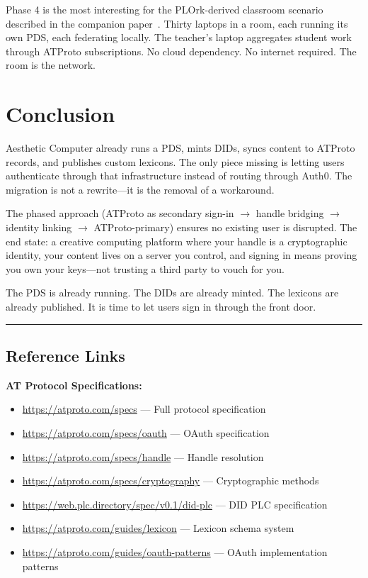 \documentclass[10pt,letterpaper,twocolumn]{article}
\begin{document}
Phase 4 is the most interesting for the PLOrk-derived classroom scenario described in the companion paper~\citep{scudder2026ac}. Thirty laptops in a room, each running its own PDS, each federating locally. The teacher's laptop aggregates student work through ATProto subscriptions. No cloud dependency. No internet required. The room is the network.


\section{Conclusion}

Aesthetic Computer already runs a PDS, mints DIDs, syncs content to ATProto records, and publishes custom lexicons. The only piece missing is letting users authenticate through that infrastructure instead of routing through Auth0. The migration is not a rewrite---it is the removal of a workaround.

The phased approach (ATProto as secondary sign-in $\to$ handle bridging $\to$ identity linking $\to$ ATProto-primary) ensures no existing user is disrupted. The end state: a creative computing platform where your handle is a cryptographic identity, your content lives on a server you control, and signing in means proving you own your keys---not trusting a third party to vouch for you.

The PDS is already running. The DIDs are already minted. The lexicons are already published. It is time to let users sign in through the front door.


\vspace{0.5em}
\noindent\rule{\columnwidth}{0.5pt}

\subsection*{Reference Links}

\noindent\small

\textbf{AT Protocol Specifications:}
\begin{itemize}
  \item \url{https://atproto.com/specs} --- Full protocol specification
  \item \url{https://atproto.com/specs/oauth} --- OAuth specification
  \item \url{https://atproto.com/specs/handle} --- Handle resolution
  \item \url{https://atproto.com/specs/cryptography} --- Cryptographic methods
  \item \url{https://web.plc.directory/spec/v0.1/did-plc} --- DID PLC specification
  \item \url{https://atproto.com/guides/lexicon} --- Lexicon schema system
  \item \url{https://atproto.com/guides/oauth-patterns} --- OAuth implementation patterns
\end{itemize}
\end{document}
